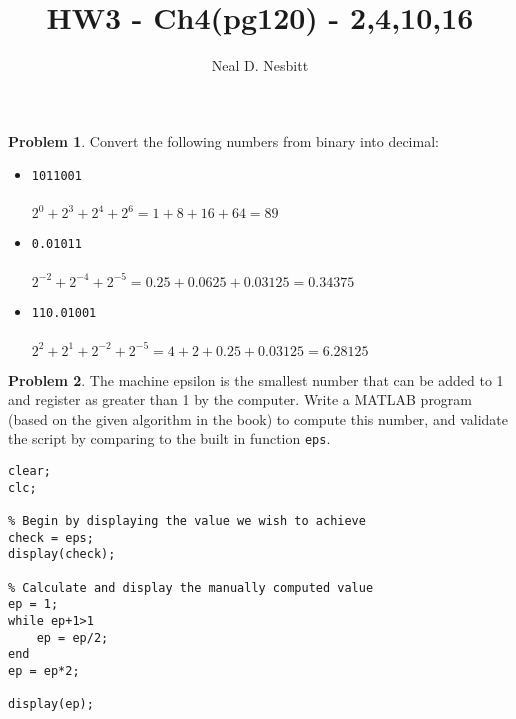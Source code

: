 \documentclass{article}
\title{HW3 - Ch4(pg120) - 2,4,10,16}
\author{Neal D. Nesbitt}
\begin{document}
\maketitle

\theoremstyle{definition}
\newtheorem{problem}{Problem}


\setcounter{problem}{1}
\begin{problem}

	Convert the following numbers from binary into decimal:
	
\end{problem}

\begin{itemize}

	\item \verb|1011001|\\
	\\
	$2^{0} + 2^{3} + 2^{4} + 2^{6} = 1 + 8 + 16 + 64 = \boxed{89}$
	
	\item \verb|0.01011|\\
	\\
	$2^{-2} + 2^{-4} + 2^{-5} = 0.25 + 0.0625 + 0.03125 = \boxed{0.34375}$
	
	\item \verb|110.01001|\\
	\\
	$2^{2} + 2^{1} + 2^{-2} + 2^{-5} = 4 + 2 + 0.25 + 0.03125 = \boxed{6.28125}$
		
\end{itemize}

\setcounter{problem}{3}
\begin{problem}

	The machine epsilon is the smallest number that can be added to 1 and register as greater than 1 by the computer. Write a MATLAB program (based on the given algorithm in the book) to compute this number, and validate the script by comparing to the built in function \verb|eps|.
	
\end{problem}
	
\begin{lstlisting}[frame=single]
% Clear our memory and working space
clear;
clc;

% Begin by displaying the value we wish to achieve
check = eps;
display(check);

% Calculate and display the manually computed value
ep = 1;
while ep+1>1
	ep = ep/2;
end
ep = ep*2;

display(ep);
\end{lstlisting}
\end{document}
